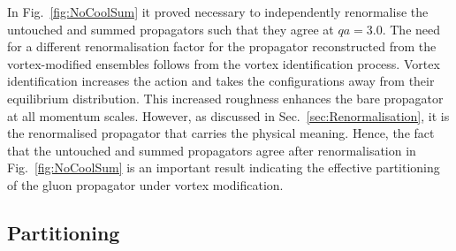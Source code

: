 \clearpage
In Fig.~\ref{fig:NoCoolSum} it proved necessary to independently renormalise the untouched and summed propagators such that they agree at $qa=3.0$. The need for a different renormalisation factor for the propagator reconstructed from the vortex-modified ensembles follows from the vortex identification process. Vortex identification increases the action and takes the configurations away from their equilibrium distribution. This increased roughness enhances the bare propagator at all momentum scales. However, as discussed in Sec.~\ref{sec:Renormalisation}, it is the renormalised propagator that carries the physical meaning. Hence, the fact that the untouched and summed propagators agree after renormalisation in Fig.~\ref{fig:NoCoolSum} is an important result indicating the effective partitioning of the gluon propagator under vortex modification.

\subsection{Partitioning}

